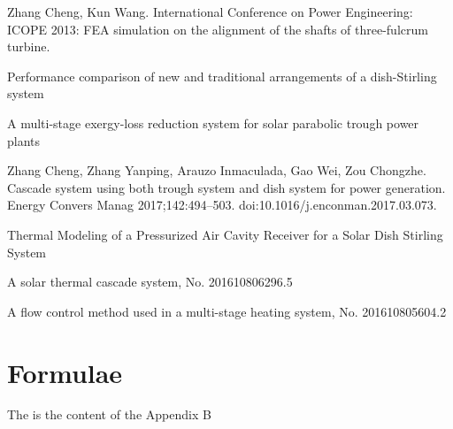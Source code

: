\appendix

\begin{publications}

  \item Zhang Cheng, Kun Wang. International Conference on Power Engineering: ICOPE 2013: FEA simulation on the alignment of the shafts of three-fulcrum turbine.
  \item Performance comparison of new and traditional arrangements of a dish-Stirling system
	\item A multi-stage exergy-loss reduction system for solar parabolic trough power plants
	\item Zhang Cheng, Zhang Yanping, Arauzo Inmaculada, Gao Wei, Zou Chongzhe. Cascade system using both trough system and dish system for power generation. Energy Convers Manag 2017;142:494–503. doi:10.1016/j.enconman.2017.03.073.
  \item Thermal Modeling of a Pressurized Air Cavity Receiver for a Solar Dish Stirling System

  \item A solar thermal cascade system, No. 201610806296.5
  \item A flow control method used in a multi-stage heating system, No. 201610805604.2

\end{publications}

\chapter{Formulae}\label{appendix:2}
  The is the content of the Appendix B